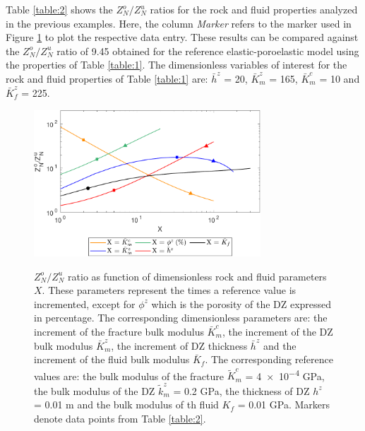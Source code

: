 \documentclass[draft]{agujournal2019}
\begin{document}
Table \ref{table:2} shows the $Z_N^o/Z_N^u$  ratios for the rock and fluid properties analyzed in the previous examples. Here, the column \emph{Marker} refers to the marker used in Figure \ref{fig:10} to plot the respective data entry.
These results can be compared against the  $Z_N^o/Z_N^u$ ratio  of 9.45 obtained for the reference elastic-poroelastic model using the properties of Table \ref{table:1}. The  dimensionless variables of interest for the rock and fluid properties of Table \ref{table:1} are: $\bar{h}^z$ = 20, $\bar{K}_m^z$ = 165, $\bar{K}_m^c$ = 10 and $\bar{K}_f^z$ = 225.

\begin{figure}
\centering
      {
        \includegraphics[width=85mm, height=55mm]{figures/zno_znu_sensitivity.pdf}
        }
        
\caption { $Z_N^o / Z_N^u$ ratio as function of dimensionless rock and fluid parameters $X$. These parameters represent the times a reference value is incremented, except for $\phi^z$ which is the porosity of the DZ expressed in percentage. The corresponding dimensionless parameters are: the increment of the fracture bulk modulus $\bar{K}_m^c$, the increment of the DZ bulk modulus $\bar{K}_m^z$, the increment of DZ thickness $\bar{h}^z$ and the increment of the fluid bulk modulus $\bar{K}_f$. The corresponding reference values are: the bulk modulus of the fracture $\tilde{K}_m^c$ = \num{4e-4} GPa, the bulk modulus of the DZ $\tilde{k}_m^z$ = 0.2 GPa, the thickness of DZ $ h^z$ = 0.01 m and the bulk modulus of th fluid $ K_f$ = 0.01 GPa. Markers denote data points from Table \ref{table:2}.
}
\label{fig:10}
\end{figure}
\end{document}
